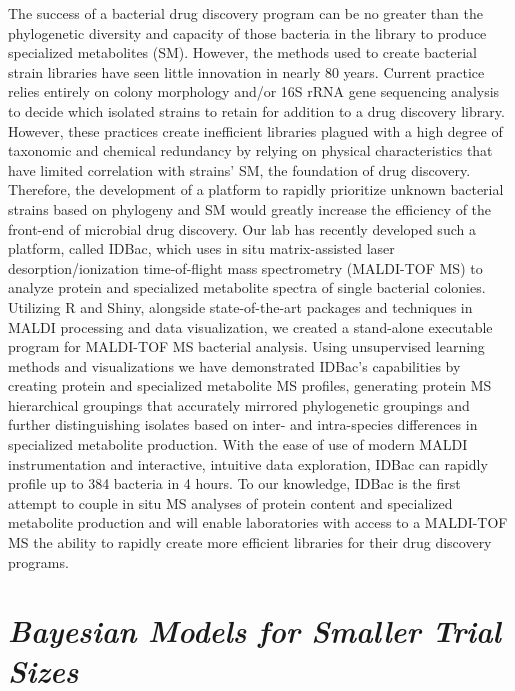 \documentclass[]{book}
\theoremstyle{definition}
\theoremstyle{definition}
\theoremstyle{definition}
\theoremstyle{remark}
\begin{document}
The success of a bacterial drug discovery program can be no greater than
the phylogenetic diversity and capacity of those bacteria in the library
to produce specialized metabolites (SM). However, the methods used to
create bacterial strain libraries have seen little innovation in nearly
80 years. Current practice relies entirely on colony morphology and/or
16S rRNA gene sequencing analysis to decide which isolated strains to
retain for addition to a drug discovery library. However, these
practices create inefficient libraries plagued with a high degree of
taxonomic and chemical redundancy by relying on physical characteristics
that have limited correlation with strains' SM, the foundation of drug
discovery. Therefore, the development of a platform to rapidly
prioritize unknown bacterial strains based on phylogeny and SM would
greatly increase the efficiency of the front-end of microbial drug
discovery. Our lab has recently developed such a platform, called IDBac,
which uses in situ matrix-assisted laser desorption/ionization
time-of-flight mass spectrometry (MALDI-TOF MS) to analyze protein and
specialized metabolite spectra of single bacterial colonies. Utilizing R
and Shiny, alongside state-of-the-art packages and techniques in MALDI
processing and data visualization, we created a stand-alone executable
program for MALDI-TOF MS bacterial analysis. Using unsupervised learning
methods and visualizations we have demonstrated IDBac's capabilities by
creating protein and specialized metabolite MS profiles, generating
protein MS hierarchical groupings that accurately mirrored phylogenetic
groupings and further distinguishing isolates based on inter- and
intra-species differences in specialized metabolite production. With the
ease of use of modern MALDI instrumentation and interactive, intuitive
data exploration, IDBac can rapidly profile up to 384 bacteria in 4
hours. To our knowledge, IDBac is the first attempt to couple in situ MS
analyses of protein content and specialized metabolite production and
will enable laboratories with access to a MALDI-TOF MS the ability to
rapidly create more efficient libraries for their drug discovery
programs.

\hypertarget{bayesian-models-for-smaller-trial-sizes}{%
\section{\texorpdfstring{\emph{Bayesian Models for Smaller Trial
Sizes}}{Bayesian Models for Smaller Trial Sizes}}\label{bayesian-models-for-smaller-trial-sizes}}
\end{document}
